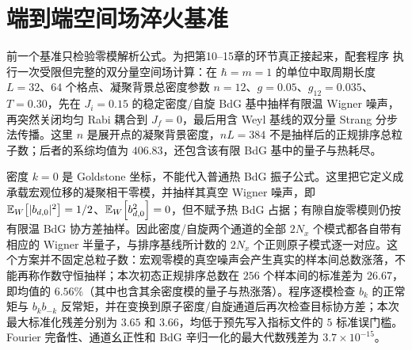 \section{端到端空间场淬火基准}

前一个基准只检验零模解析公式。为把第10--15章的环节真正接起来，配套程序
执行一次受限但完整的双分量空间场计算：在 $\hbar=m=1$ 的单位中取周期长度 $L=32$、$64$ 个格点、凝聚背景总密度参数 $n=12$、$g=0.05$、$g_{12}=0.035$、$T=0.30$，先在 $J_i=0.15$ 的稳定密度/自旋 BdG 基中抽样有限温 Wigner 噪声，再突然关闭均匀 Rabi 耦合到 $J_f=0$，最后用含 Weyl 基线的双分量 Strang 分步法传播。这里 $n$ 是展开点的凝聚背景密度，$nL=384$ 不是抽样后的正规排序总粒子数；后者的系综均值为 $406.83$，还包含该有限 BdG 基中的量子与热耗尽。

密度 $k=0$ 是 Goldstone 坐标，不能代入普通热 BdG 振子公式。这里把它定义成承载宏观位移的凝聚相干零模，并抽样其真空 Wigner 噪声，即 $\mathbb{E}_{W}\!\left[|b_{d,0}|^2\right]=1/2$、$\mathbb{E}_{W}\!\left[b_{d,0}^2\right]=0$，但不赋予热 BdG 占据；有隙自旋零模则仍按有限温 BdG 协方差抽样。因此密度/自旋两个通道的全部 $2N_x$ 个模式都各自带有相应的 Wigner 半量子，与排序基线所计数的 $2N_x$ 个正则原子模式逐一对应。这个方案并不固定总粒子数：宏观零模的真空噪声会产生真实的样本间总数涨落，不能再称作数守恒抽样；本次初态正规排序总数在 $256$ 个样本间的标准差为 $26.67$，即均值的 $6.56\%$（其中也含其余密度模的量子与热涨落）。程序逐模检查 $b_k$ 的正常矩与 $b_kb_{-k}$ 反常矩，并在变换到原子密度/自旋通道后再次检查目标协方差；本次最大标准化残差分别为 $3.65$ 和 $3.66$，均低于预先写入指标文件的 $5$ 标准误门槛。Fourier 完备性、通道幺正性和 BdG 辛归一化的最大代数残差为 $3.7\times10^{-15}$。

